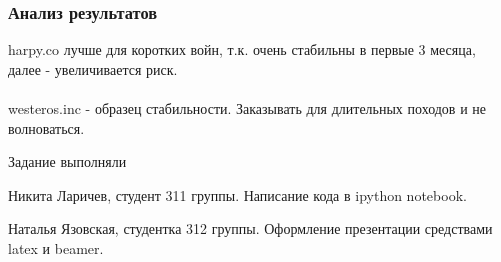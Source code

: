 \documentclass[8pt]{beamer}
\begin{document}
\begin{frame}
\frametitle{Анализ результатов}
harpy.co лучше для коротких войн, т.к. очень стабильны в первые 3 месяца, \\далее - увеличивается риск.\\
~\\
westeros.inc - образец стабильности. Заказывать для длительных походов и не волноваться.
\end{frame}

\begin{frame}{Задание выполняли}
	\begin{itemize}
		{\small
		\item Никита Ларичев, студент 311 группы. Написание кода в ipython notebook.
		\item Наталья Язовская, студентка 312 группы. Оформление презентации средствами latex и beamer.}
	\end{itemize}	

\end{frame}
\end{document}

